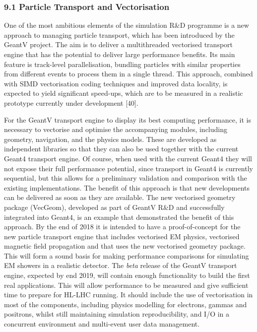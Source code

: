 \documentclass[12pt,a4paper]{article}
\begin{document}
\hypertarget{particle-transport-and-vectorisation}{%
\subsubsection{9.1 Particle Transport and
Vectorisation}\label{particle-transport-and-vectorisation}}

One of the most ambitious elements of the simulation R\&D programme is a
new approach to managing particle transport, which has been introduced
by the GeantV project. The aim is to deliver a multithreaded vectorised
transport engine that has the potential to deliver large performance
benefits. Its main feature is track-level parallelisation, bundling
particles with similar properties from different events to process them
in a single thread. This approach, combined with SIMD vectorisation
coding techniques and improved data locality, is expected to yield
significant speed-ups, which are to be measured in a realistic prototype
currently under development {[}40{]}.

For the GeantV transport engine to display its best computing
performance, it is necessary to vectorise and optimise the accompanying
modules, including geometry, navigation, and the physics models. These
are developed as independent libraries so that they can also be used
together with the current Geant4 transport engine. Of course, when used
with the current Geant4 they will not expose their full performance
potential, since transport in Geant4 is currently sequential, but this
allows for a preliminary validation and comparison with the existing
implementations. The benefit of this approach is that new developments
can be delivered as soon as they are available. The new vectorised
geometry package (VecGeom), developed as part of GeantV R\&D and
successfully integrated into Geant4, is an example that demonstrated the
benefit of this approach. By the end of 2018 it is intended to have a
proof-of-concept for the new particle transport engine that includes
vectorised EM physics, vectorised magnetic field propagation and that
uses the new vectorised geometry package. This will form a sound basis
for making performance comparisons for simulating EM showers in a
realistic detector. The \emph{beta} release of the GeantV transport
engine, expected by end 2019, will contain enough functionality to build
the first real applications. This will allow performance to be measured
and give sufficient time to prepare for HL-LHC running. It should
include the use of vectorisation in most of the components, including
physics modelling for electrons, gammas and positrons, whilst still
maintaining simulation reproducibility, and I/O in a concurrent
environment and multi-event user data management.
\end{document}
